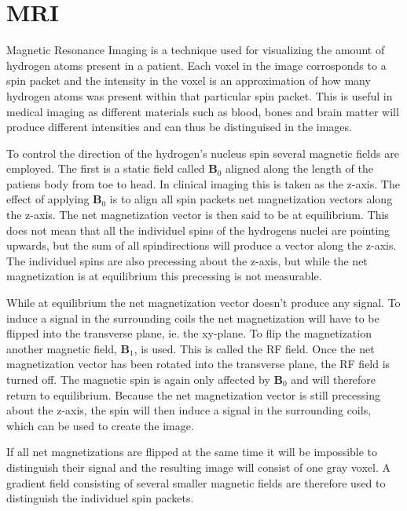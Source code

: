 \section{MRI}
\label{sec:MRI}


Magnetic Resonance Imaging is a technique used for visualizing the
amount of hydrogen atoms present in a patient. Each voxel in the image
corrosponds to a spin packet and the intensity in the voxel is an
approximation of how many hydrogen atoms was present within that
particular spin packet. This is useful in medical imaging as different
materials such as blood, bones and brain matter will produce different
intensities and can thus be distinguised in the images.


To control the direction of the hydrogen's nucleus spin several
magnetic fields are employed. The first is a static field called
$\mathbf{B}_0$ aligned along the length of the patiens body from toe
to head. In clinical imaging this is taken as the z-axis. The effect
of applying $\mathbf{B}_0$ is to align all spin packets net
magnetization vectors along the z-axis. The net magnetization vector
is then said to be at equilibrium. This does not mean that all the
individuel spins of the hydrogens nuclei are pointing upwards, but the
sum of all spindirections will produce a vector along the z-axis. The
individuel spins are also precessing about the z-axis, but while the
net magnetization is at equilibrium this precessing is not measurable.


While at equilibrium the net magnetization vector doesn't produce any
signal. To induce a signal in the surrounding coils the net
magnetization will have to be flipped into the transverse plane,
ie. the xy-plane. To flip the magnetization another magnetic field,
$\mathbf{B}_1$, is used. This is called the RF field. Once the net
magnetization vector has been rotated into the transverse plane, the
RF field is turned off. The magnetic spin is again only affected by
$\mathbf{B}_0$ and will therefore return to equilibrium. Because the
net magnetization vector is still precessing about the z-axis, the
spin will then induce a signal in the surrounding coils, which can be
used to create the image.


If all net magnetizations are flipped at the same time it will be
impossible to distinguish their signal and the resulting image will
consist of one gray voxel. A gradient field consisting of several
smaller magnetic fields are therefore used to distinguish the
individuel spin packets.

